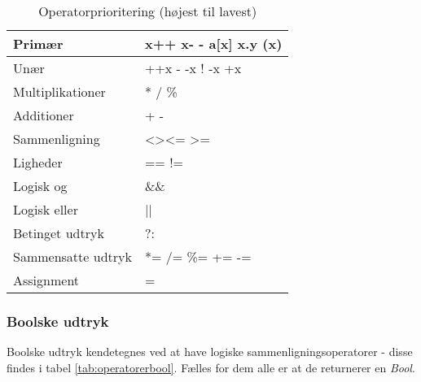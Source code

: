 \begin{table}[H]
    \centering
    \begin{tabular}{|l|l|}
        \hline
        \centering

        Primær             & x++ \quad x- - \quad a{[}x{]} \quad x.y \quad (x)                 \\ \hline
        Unær               & ++x \quad - -x \quad ! \quad -x \quad +x  \\ \hline
        Multiplikationer   & * \quad / \quad \%                                               \\ \hline
        Additioner         & + \quad -                                                        \\ \hline
        Sammenligning      & \textless \quad \textgreater \quad \textless= \quad\textgreater= \\ \hline
        Ligheder           & == \quad !=                                                      \\ \hline
        Logisk og          & \&\&                                                              \\ \hline
        Logisk eller       & ||                                                               \\ \hline
        Betinget udtryk    & ?:                                                               \\ \hline
        Sammensatte udtryk & *= \quad /= \quad \%= \quad += \quad -=                          \\ \hline
        Assignment         & =                                                                \\ \hline

    \end{tabular}
    \caption{Operatorprioritering (højest til lavest)}
    \label{tab:operatorprioritering}
\end{table}


\subsubsection{Boolske udtryk}
Boolske udtryk kendetegnes ved at have logiske sammenligningsoperatorer - disse findes i tabel \ref{tab:operatorerbool}. Fælles for dem alle er at de returnerer en \textit{Bool}.

